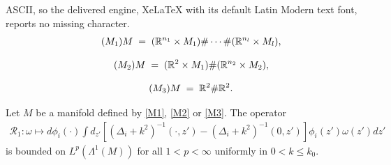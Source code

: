 \documentclass[10pt,a4paper]{amsart}
\begin{document}
ASCII, so the delivered engine, XeLaTeX with its default Latin Modern text font, reports no missing character.
\begin{align}\label{M1}\tag{$\textrm{M}_1$}
    M \;=\; (\mathbb{R}^{n_1} \times M_1) \# \cdots \# (\mathbb{R}^{n_l} \times M_l),
\end{align}

\begin{align}\label{M2}\tag{$\textrm{M}_2$}
    M \;=\; (\mathbb{R}^2 \times M_1) \# (\mathbb{R}^{n_2} \times M_2),
\end{align}

\begin{align}\label{M3}\tag{$\textrm{M}_3$}
    M \;=\; \mathbb{R}^2 \# \mathbb{R}^2.
\end{align}

\begin{lemma}\label{lemma_good1}
Let $M$ be a manifold defined by \eqref{M1}, \eqref{M2} or \eqref{M3}. The operator
\begin{align*}
    \mathcal{R}_1: \omega \mapsto d\phi_i(\cdot) \int d_{z'} \left[(\Delta_i+k^2)^{-1}(\cdot, z') - (\Delta_i+k^2)^{-1}(0,z') \right] \phi_i(z') \omega(z') dz'
\end{align*}
is bounded on $L^p(\Lambda^1(M))$ for all $1<p<\infty$ uniformly in $0<k\le k_0$.
\end{lemma}
\end{document}
